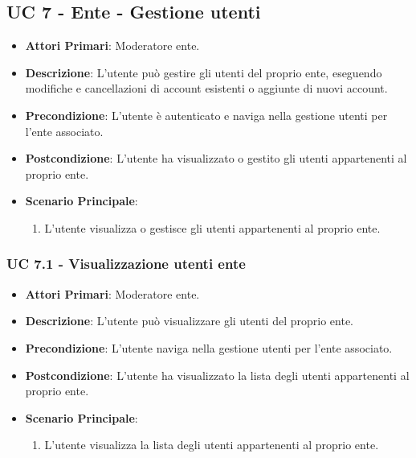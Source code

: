 	\subsection{UC 7 - Ente - Gestione utenti}
		
		\begin{itemize}
			\item \textbf{Attori Primari}: Moderatore ente.
			\item \textbf{Descrizione}: L'utente può gestire gli utenti del proprio ente, eseguendo modifiche e cancellazioni di account esistenti o aggiunte di nuovi account.
			\item \textbf{Precondizione}: L'utente è autenticato e naviga nella gestione utenti per l'ente associato.
			\item \textbf{Postcondizione}: L'utente ha visualizzato o gestito gli utenti appartenenti al proprio ente.
			\item \textbf{Scenario Principale}:
			\begin{enumerate}
				\item{L'utente visualizza o gestisce gli utenti appartenenti al proprio ente.}
			\end{enumerate}	
		\end{itemize}
			
			\subsubsection{UC 7.1 - Visualizzazione utenti ente}
			\begin{itemize}
				\item \textbf{Attori Primari}: Moderatore ente.
				\item \textbf{Descrizione}: L'utente può visualizzare gli utenti del proprio ente.
				\item \textbf{Precondizione}: L'utente naviga nella gestione utenti per l'ente associato.
				\item \textbf{Postcondizione}: L'utente ha visualizzato la lista degli utenti appartenenti al proprio ente.
				\item \textbf{Scenario Principale}:
				\begin{enumerate}
					\item{L'utente visualizza la lista degli utenti appartenenti al proprio ente.}
				\end{enumerate}	
			\end{itemize}
			
